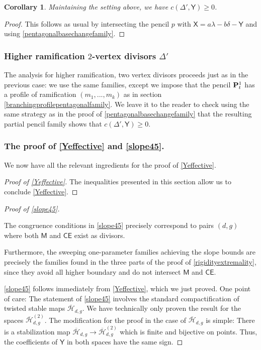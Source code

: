 \documentclass[reqno, 10 pt]{article}
\newtheorem{cor}[thm]{Corollary}
\theoremstyle{definition}
\theoremstyle{remark}
\numberwithin{equation}{section}
\numberwithin{thm}{section}
\numberwithin{prop}{section}
\numberwithin{lem}{section}
\numberwithin{cor}{section}
\numberwithin{conj}{section}
\numberwithin{defn}{section}
\renewcommand{\H}{\mathcal H}
\newcommand{\Hdg}{\overline{\H}_{d,g}}
\newcommand{\Hdgnt}{\overline{\H}_{d,g}^{(2)}}
\renewcommand{\to}{\longrightarrow}
\newcommand{\sfY}{{\mathsf Y}}
\newcommand{\sfX}{{\mathsf X}}
\newcommand{\sfCE}{{\mathsf {CE}}}
\newcommand{\sfM}{{\mathsf M}}
\renewcommand{\P}{{\bf P}}
\renewcommand{\H}{{\mathcal{H}}}
\begin{document}
\begin{cor}
Maintaining the setting above,  we have $c(\Delta', \sfY) \geq 0$. 
\end{cor}
\begin{proof}
This follows as usual by intersecting the pencil $p$ with $\sfX = a\lambda - b\delta - \sfY$ and using \autoref{pentagonalbasechangefamily}.
\end{proof}

\subsubsection{Higher ramification $2$-vertex divisors $\Delta'$} The analysis for higher ramification, two vertex divisors proceeds just as in the previous case: we use the same families, except we impose that the pencil $\P^{1}_{t}$ has a profile of ramification $(m_{1}, ... ,m_{k})$ as in section \ref{branchingprofilepentagonalfamily}.  We leave it to the reader to check using the same strategy as in the proof of \autoref{pentagonalbasechangefamily} that the resulting partial pencil family shows that $c(\Delta', \sfY) \geq  0$. 


\subsubsection{The proof of \autoref{Yeffective} and \autoref{slope45}.} We now have all the relevant ingredients for the proof of \autoref{Yeffective}. 

\begin{proof}[Proof of \autoref{Yeffective}]
The inequalities presented in this section allow us to conclude \autoref{Yeffective}.
\end{proof}

\begin{proof}[Proof of \autoref{slope45}]\label{proofslope45}

The congruence conditions in \autoref{slope45} precisely correspond to pairs $(d,g)$ where both $\sfM$ and $\sfCE$ exist as divisors.

Furthermore, the sweeping one-parameter families achieving the slope bounds are precisely the families found in the three parts of the proof of \autoref{rigidityextremality}, since they avoid all higher boundary and do not intersect $\sfM$ and $\sfCE$.


\autoref{slope45} follows immediately from \autoref{Yeffective}, which we just proved.  One point of care:  The statement of \autoref{slope45} involves the standard compactification of twisted stable maps $\Hdg$.  We have technically only proven the result for the spaces $\Hdgnt$.  The modification for the proof in the case of $\Hdg$ is simple: There is a stabilization map $\Hdg \to \Hdgnt$ which is finite and bijective on points. Thus, the coefficients of $\sfY$ in both spaces have the same sign.  


\end{proof} 
\end{document}
